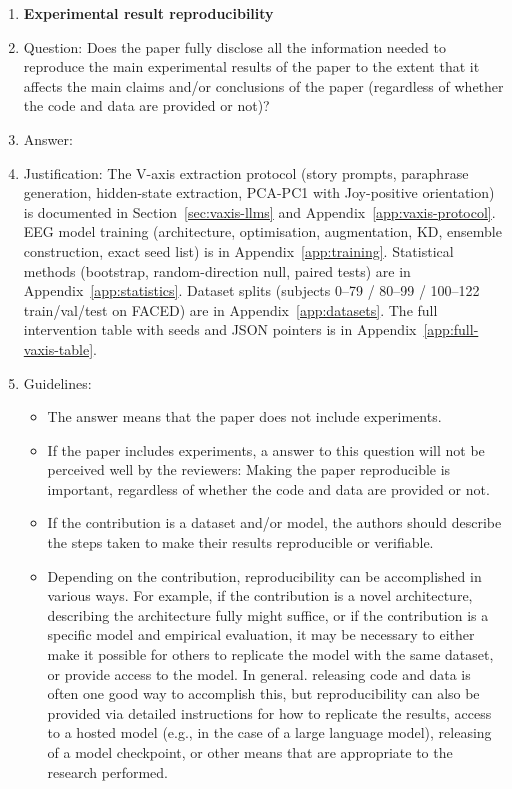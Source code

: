 \begin{enumerate}
\item {\bf Experimental result reproducibility}
    \item[] Question: Does the paper fully disclose all the information needed to reproduce the main experimental results of the paper to the extent that it affects the main claims and/or conclusions of the paper (regardless of whether the code and data are provided or not)?
    \item[] Answer: \answerYes{}
    \item[] Justification: The V-axis extraction protocol (story prompts, paraphrase generation, hidden-state extraction, PCA-PC1 with Joy-positive orientation) is documented in Section~\ref{sec:vaxis-llms} and Appendix~\ref{app:vaxis-protocol}. EEG model training (architecture, optimisation, augmentation, KD, ensemble construction, exact seed list) is in Appendix~\ref{app:training}. Statistical methods (bootstrap, random-direction null, paired tests) are in Appendix~\ref{app:statistics}. Dataset splits (subjects 0--79 / 80--99 / 100--122 train/val/test on FACED) are in Appendix~\ref{app:datasets}. The full intervention table with seeds and JSON pointers is in Appendix~\ref{app:full-vaxis-table}.
    \item[] Guidelines:
    \begin{itemize}
        \item The answer \answerNA{} means that the paper does not include experiments.
        \item If the paper includes experiments, a \answerNo{} answer to this question will not be perceived well by the reviewers: Making the paper reproducible is important, regardless of whether the code and data are provided or not.
        \item If the contribution is a dataset and\slash or model, the authors should describe the steps taken to make their results reproducible or verifiable.
        \item Depending on the contribution, reproducibility can be accomplished in various ways. For example, if the contribution is a novel architecture, describing the architecture fully might suffice, or if the contribution is a specific model and empirical evaluation, it may be necessary to either make it possible for others to replicate the model with the same dataset, or provide access to the model. In general. releasing code and data is often one good way to accomplish this, but reproducibility can also be provided via detailed instructions for how to replicate the results, access to a hosted model (e.g., in the case of a large language model), releasing of a model checkpoint, or other means that are appropriate to the research performed.

\end{itemize}
\end{enumerate}
